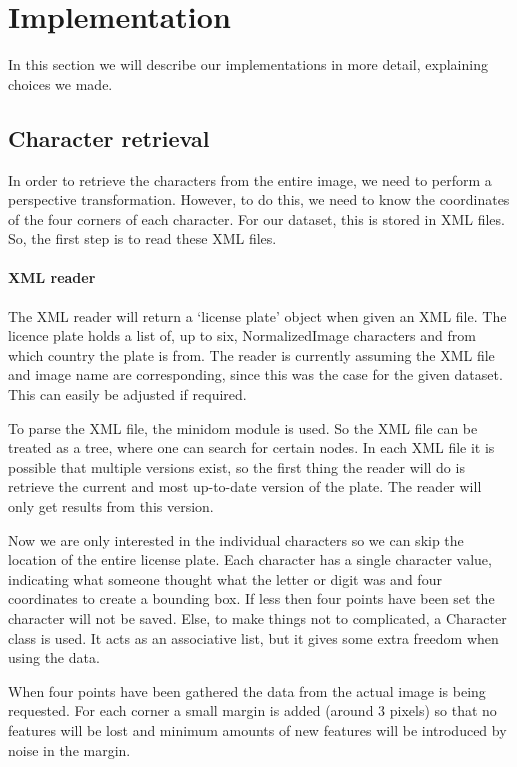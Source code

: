 \documentclass[a4paper]{article}
\begin{document}
\section{Implementation}

In this section we will describe our implementations in more detail, explaining
choices we made.

\subsection{Character retrieval}

In order to retrieve the characters from the entire image, we need to
perform a perspective transformation. However, to do this, we need to know the
coordinates of the four corners of each character. For our dataset, this is
stored in XML files. So, the first step is to read these XML files.

\paragraph*{XML reader}

The XML reader will return a `license plate' object when given an XML file. The
licence plate holds a list of, up to six, NormalizedImage characters and from
which country the plate is from. The reader is currently assuming the XML file
and image name are corresponding, since this was the case for the given
dataset. This can easily be adjusted if required.

To parse the XML file, the minidom module is used. So the XML file can be
treated as a tree, where one can search for certain nodes. In each XML
file it is possible that multiple versions exist, so the first thing the reader
will do is retrieve the current and most up-to-date version of the plate. The
reader will only get results from this version.

Now we are only interested in the individual characters so we can skip the
location of the entire license plate. Each character has
a single character value, indicating what someone thought what the letter or
digit was and four coordinates to create a bounding box. If less then four
points have been set the character will not be saved. Else, to make things not
to complicated, a Character class is used. It acts as an associative list, but
it gives some extra freedom when using the data.

When four points have been gathered the data from the actual image is being
requested. For each corner a small margin is added (around 3 pixels) so that no
features will be lost and minimum amounts of new features will be introduced by
noise in the margin.
\end{document}
